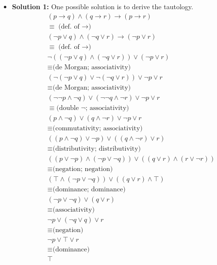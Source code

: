 \begin{enumerate}
{\begin{itemize}
\item \textbf{Solution 1:} One possible solution is to derive the tautology.
\allowdisplaybreaks
\begin{align*}
& (p \rightarrow q) \wedge (q \rightarrow r) \rightarrow (p \rightarrow r) \\ & \equiv \text{(def. of $\rightarrow$)} \\
& (\neg{p} \vee q) \wedge (\neg{q} \vee r) \rightarrow (\neg{p} \vee r) \\ & \equiv \text{(def. of $\rightarrow$)} \\
& \neg{((\neg{p} \vee q) \wedge (\neg{q} \vee r))} \vee (\neg{p} \vee r) \\ & \equiv \text{(de Morgan; associativity)} \\
& (\neg{(\neg{p} \vee q)} \vee \neg{(\neg{q} \vee r)}) \vee \neg{p} \vee r  \\ & \equiv \text{(de Morgan; associativity)} \\
& (\neg{\neg{p}} \wedge \neg{q}) \vee (\neg{\neg{q}} \wedge \neg{r}) \vee \neg{p} \vee r  \\ & \equiv \text{(double $\neg$; associativity)} \\
& (p \wedge \neg{q}) \vee (q \wedge \neg{r}) \vee \neg{p} \vee r  \\ & \equiv \text{(commutativity; associativity)} \\
& ((p \wedge \neg{q}) \vee \neg{p}) \vee ((q \wedge \neg{r})  \vee r)  \\ & \equiv \text{(distributivity; distributivity)} \\
& ((p \vee \neg{p}) \wedge (\neg{p} \vee \neg{q})) \vee ((q \vee r) \wedge (r \vee \neg{r})) \\ & \equiv \text{(negation; negation)} \\
& (\top \wedge (\neg{p} \vee \neg{q})) \vee ((q \vee r) \wedge \top) \\ & \equiv \text{(dominance; dominance)} \\
& (\neg{p} \vee \neg{q}) \vee (q \vee r) \\ & \equiv \text{(associativity)} \\
& \neg{p} \vee (\neg{q} \vee q) \vee r \\ & \equiv \text{(negation)} \\
& \neg{p} \vee \top \vee r \\ & \equiv \text{(dominance)} \\
& \top
\end{align*}


\end{itemize}}
\end{enumerate}
